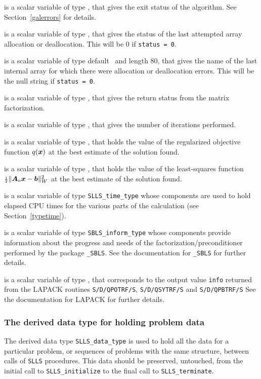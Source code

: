 \documentclass{galahad}
\newcommand{\packagename}{SLLS}
\begin{document}
\begin{description}

 is a scalar variable of type \integer, that gives the
exit status of the algorithm.
See Section~\ref{galerrors}
for details.

 is a scalar variable of type \integer, that gives
the status of the last attempted array allocation or deallocation.
This will be 0 if {\tt status = 0}.

 is a scalar variable of type default \character\
and length 80, that  gives the name of the last internal array
for which there were allocation or deallocation errors.
This will be the null string if {\tt status = 0}.

 is a scalar variable of type \integer, that
gives the return status from the matrix factorization.

 is a scalar variable of type \integer, that
gives the number of iterations performed.

 is a scalar variable of type \realdp, that holds the
value of the regularized objective function $q({\bm{x}})$ at the 
best estimate of the solution found.

 is a scalar variable of type \realdp, that holds the value of 
the least-squares function ${\scriptstyle \frac{1}{2}} \| {\bm{A}}_o {\bm{x}} - {\bm{b}}\|_W^2$ 
at the best estimate of the solution found.

 is a scalar variable of type {\tt \packagename\_time\_type}
whose components are used to hold elapsed CPU times for the various parts
of the calculation (see Section~\ref{typetime}).

 is a scalar variable of type
{\tt SBLS\_inform\_type} %
whose components provide information about the progress and needs
of the factorization/preconditioner
performed by the package
{\tt \libraryname\_SBLS}.
See the documentation for {\tt \libraryname\_SBLS} for further details.

 is a scalar variable of type \integer,
that corresponds to the output value {\tt info} returned from
the LAPACK routines {\tt S/D/QPOTRF/S},
{\tt S/D/QSYTRF/S} and {\tt S/D/QPBTRF/S}
See the documentation for LAPACK for further details.
\end{description}


\subsubsection{The derived data type for holding problem data}\label{typedata}
The derived data type
{\tt \packagename\_data\_type}
is used to hold all the data for a particular problem,
or sequences of problems with the same structure, between calls of
{\tt \packagename} procedures.
This data should be preserved, untouched, from the initial call to
{\tt \packagename\_initialize}
to the final call to
{\tt \packagename\_terminate}.
\end{document}
